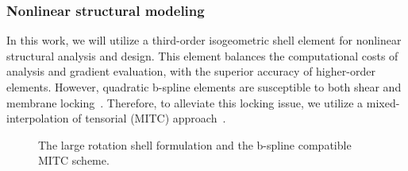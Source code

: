 \documentclass[]{aiaa-tc}
\begin{document}
\subsubsection{Nonlinear structural modeling}

In this work, we will utilize a third-order isogeometric shell element
for nonlinear structural analysis and design.  This element balances
the computational costs of analysis and gradient evaluation, with the
superior accuracy of higher-order elements. However, quadratic
b-spline elements are susceptible to both shear and membrane
locking~\cite{Babuska:1992:OLR, Chapelle.Bathe}. Therefore, to
alleviate this locking issue, we utilize a mixed-interpolation of
tensorial (MITC) approach~\cite{Dvorkin:1984:CMB, Bucalem:1993:HOM}.

\begin{figure}[h]
  \centering
  \caption{The large rotation shell formulation and the b-spline
    compatible MITC scheme.}
  \label{fig:shell-figs}
\end{figure}
\end{document}
